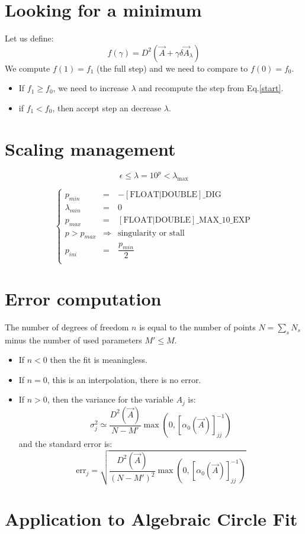 \documentclass[aps,12pt]{revtex4}
\begin{document}
\section{Looking for a minimum}
Let us define:
\begin{equation}
	f(\gamma)  =  D^2(\vec{A}+\gamma \delta\vec{A}_\lambda)
\end{equation}
We compute $f(1)=f_1$ (the full step) and we need to compare to $f(0)=f_0$.
\begin{itemize}
\item If $f_1\geq f_0$, we need to increase $\lambda$ and recompute the step from Eq.\eqref{start}.
\item if $f_1<f_0$, then accept step an decrease $\lambda$.
\end{itemize}

\section{Scaling management}

\begin{equation}
	\epsilon \leq \lambda = 10^p < \lambda_{\max}
\end{equation}

\begin{equation}
\left\lbrace
\begin{array}{lcl}
	p_{min}  & =  &-\mathrm{[FLOAT|DOUBLE]\_DIG}\\
	\lambda_{min} & = & 0\\
 	\hline
	p_{max} & = &  \mathrm{[FLOAT|DOUBLE]\_MAX\_10\_EXP}\\
	p>p_{max}& \Rightarrow & \text{singularity or stall}\\
	\hline
	p_{ini} & = & \dfrac{p_{min}}{2}\\
\end{array}
\right.
\end{equation}

\section{Error computation}
The number of degrees of freedom $n$ is equal to the number of points $N=\sum_s N_s$ minus the number of used parameters $M'\leq M$.
\begin{itemize}
\item If $n<0$ then the fit is meaningless.
\item If $n=0$, this is an interpolation, there is no error.
\item If $n>0$, then the variance for the variable $A_j$ is:
\begin{equation}
	\sigma^2_j \simeq \dfrac{D^2(\vec{A})}{N-M'} \max\left(0,\left[\alpha_0(\vec{A})\right]^{-1}_{jj}\right)
\end{equation}
and the standard error is:
\begin{equation}
	\mathrm{err}_j = \sqrt{\dfrac{D^2(\vec{A})}{\left(N-M'\right)^2} \max\left(0,\left[\alpha_0(\vec{A})\right]^{-1}_{jj}\right) }
\end{equation}

\end{itemize}

\section{Application to Algebraic Circle Fit}



 
\end{document}
